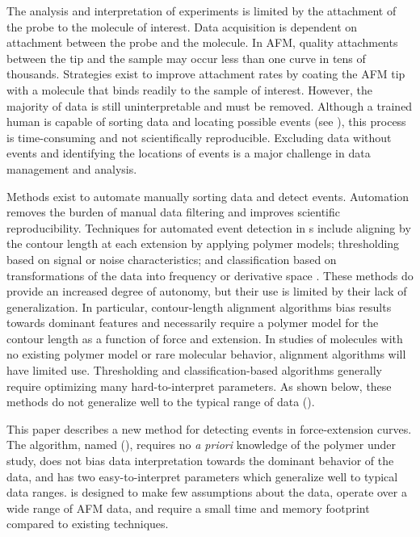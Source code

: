 The analysis and interpretation of \singlemol{} experiments is limited by the attachment of the probe to the molecule of interest. Data acquisition is dependent on attachment between the probe and the molecule. In AFM, quality attachments between the tip and the sample may occur less than one curve in tens of thousands. Strategies exist to improve attachment rates by coating the AFM tip with a molecule that binds readily to the sample of interest.\cite{walder_robert_rapid_nodate} However, the majority of data is still uninterpretable and must be removed. Although a trained human is capable of sorting \singlemol{} data and locating possible events (see ), this process is time-consuming and not scientifically reproducible. Excluding data without events and identifying the locations of events is a major challenge in \singlemol{} data management and analysis.

Methods exist to automate manually sorting \singlemol{} data and detect events. Automation removes the burden of manual data filtering and improves scientific reproducibility. Techniques for automated event detection in \fec{}s include aligning by the contour length at each extension by applying polymer models; thresholding based on signal or noise characteristics; and classification based on transformations of the data into frequency or derivative space . These methods do provide an increased degree of autonomy, but their use is limited by their lack of generalization. In particular, contour-length alignment algorithms bias results towards dominant features and necessarily require a polymer model for the contour length as a function of force and extension. In \singlemol{} studies of molecules with no existing polymer model or rare molecular behavior, alignment algorithms will have limited use.  Thresholding and classification-based algorithms generally require optimizing many hard-to-interpret parameters. As shown below, these methods do not generalize well to the typical range of \singlemol{} data ().

This paper describes a new method for detecting events in \singlemol{} force-extension curves.  The algorithm, named \name{} (\acronym{}), requires no \textit{a priori} knowledge of the polymer under study, does not bias data interpretation towards the dominant behavior of the data, and has two easy-to-interpret parameters which generalize well to typical \singlemol{} data ranges. \name{} is designed to make few assumptions about the data, operate over a wide range of AFM data, and require a small time and memory footprint compared to existing techniques.

